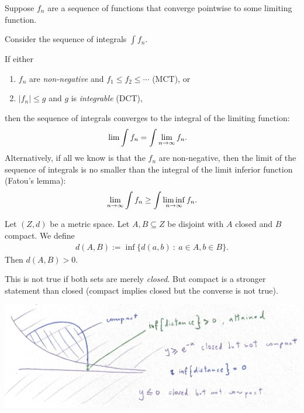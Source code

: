 \begin{theorem*}
  Suppose $f_n$ are a sequence of functions that converge pointwise to some limiting function.

  Consider the sequence of integrals $\int f_n$.

  If either
  \begin{enumerate}
  \item $f_n$ are {\it non-negative} and $f_1 \leq f_2 \leq \cdots$ (MCT), or
  \item $|f_n| \leq g$ and $g$ is {\it integrable} (DCT),
  \end{enumerate}
  then the sequence of integrals converges to the integral of the limiting function:
  \begin{align*}
    \lim \int f_n &= \int \limn f_n.
  \end{align*}
  Alternatively, if all we know is that the $f_n$ are non-negative, then the limit of the sequence of integrals
  is no smaller than the integral of the limit inferior function (Fatou's lemma):
  \begin{align*}
  \limn \int f_n \geq \int \liminf_{n\to\infty} f_n.
  \end{align*}
\end{theorem*}

\begin{lemma}\label{closed-compact-separation-lemma}
 Let $(Z, d)$ be a metric space. Let $A, B \subseteq Z$ be disjoint with $A$ closed and $B$ compact. We define
 \begin{align*}
   d(A, B) := \inf \{d(a, b) ~:~ a \in A, b \in B\}.
 \end{align*}
 Then $d(A, B) > 0$.
\end{lemma}

\begin{remark*}
  This is not true if both sets are merely {\it closed}. But compact is a stronger statement than closed (compact
  implies closed but the converse is not true).
\end{remark*}

\begin{mdframed}
\includegraphics[width=400pt]{img/analysis--berkeley-202a--every-function-(in-l^p)-is-nearly-continuous-6fed.png}
\end{mdframed}

